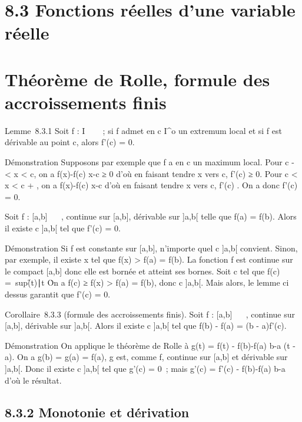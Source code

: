 
\section{8.3 Fonctions réelles d'une variable réelle}

\section{Théorème de Rolle, formule des accroissements finis}
\label{sec:theoreme-de-rolle}



Lemme~8.3.1 Soit f : I \rightarrow~ ~~; si f admet en c \in I^o un
extremum local et si f est dérivable au point c, alors f'(c) = 0.

Démonstration Supposons par exemple que f a en c un maximum local. Pour
c - \eta < x < c, on a  f(x)-f(c)
\over x-c ≥ 0 d'où en faisant tendre x vers c, f'(c) ≥
0. Pour c < x < c + \eta, on a  f(x)-f(c)
\over x-c  d'où en faisant tendre x vers c, f'(c) . On a donc f'(c) = 0.

\begin{thm}[Rolle]
   Soit f : [a,b] \rightarrow~ ~, continue sur [a,b],
dérivable sur ]a,b[ telle que f(a) = f(b). Alors il existe c
\in]a,b[ tel que f'(c) = 0.

\end{thm}
Démonstration Si f est constante sur [a,b], n'importe quel c
\in]a,b[ convient. Sinon, par exemple, il existe x \in [a,b] tel que
f(x) > f(a) = f(b). La fonction f est continue sur le
compact [a,b] donc elle est bornée et atteint ses bornes. Soit c \in
[a,b] tel que f(c) =\
sup\f(t)∣t \in
[a,b]\. On a f(c) ≥ f(x) > f(a) =
f(b), donc c \in]a,b[. Mais alors, le lemme ci dessus garantit que
f'(c) = 0.

Corollaire~8.3.3 (formule des accroissements finis). Soit f : [a,b]
\rightarrow~ \mathbb{R}~, continue sur [a,b], dérivable sur ]a,b[. Alors il existe c
\in]a,b[ tel que f(b) - f(a) = (b - a)f'(c).

Démonstration On applique le théorème de Rolle à g(t) = f(t) -
f(b)-f(a) \over b-a (t - a). On a g(b) = g(a) = f(a), g
est, comme f, continue sur [a,b] et dérivable sur ]a,b[. Donc il
existe c \in]a,b[ tel que g'(c) = 0~; mais g'(c) = f'(c) - f(b)-f(a)
\over b-a d'où le résultat.

\subsection{8.3.2 Monotonie et dérivation}

